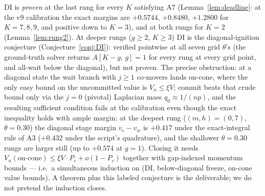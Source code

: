 \begin{remark}
DI is \emph{proven} at the last rung for every $K$ satisfying A7 (Lemma~\ref{lem:deadline}: at the v9 calibration the exact margins are $+0.5744$, $+0.8480$, $+1.2800$ for $K = 7, 8, 9$, and positive down to $K = 3$), and at both rungs for $K = 2$ (Lemma~\ref{lem:rung2}). At deeper rungs ($g \ge 2$, $K \ge 3$) DI is the diagonal-ignition conjecture (Conjecture~\ref{conj:DI}): verified pointwise at all seven grid $\theta$'s (the ground-truth solver returns $A[K-g,\, g] = 1$ for every rung at every grid point, and all-wait below the diagonal), but not proven. The precise obstruction: at a diagonal state the wait branch with $j \ge 1$ co-movers lands on-cone, where the only easy bound on the uncommitted value is $V_u \le \xi V$; commit beats that crude bound only via the $j = 0$ (pivotal) Laplacian mass $q_0 \approx 1/(np)$, and the resulting sufficient condition fails at the calibration even though the exact inequality holds with ample margin: at the deepest rung ($(m,h) = (0,7)$, $\theta = 0.30$) the diagonal stage margin $v_c - v_w$ is $+0.417$ under the exact-integral rule of A3 ($+0.432$ under the script's quadrature), and the shallower $\theta = 0.30$ rungs are larger still (up to $+0.574$ at $g = 1$). Closing it needs $V_u(\text{on-cone}) \le \xi V \cdot P_c + o(1 - P_c)$ together with gap-indexed momentum bounds --- i.e.\ a simultaneous induction on (DI, below-diagonal freeze, on-cone value bounds). A theorem plus this labeled conjecture is the deliverable; we do not pretend the induction closes.
\end{remark}

